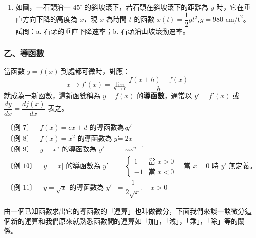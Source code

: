 \begin{enumerate}[label=\arabic*., leftmargin=2em]
  \item 如圖，一石頭沿一 $45^\circ$ 的斜坡滾下，若石頭在斜坡滾下的距離為 $y$ 時，它在垂直方向下降的高度為 $x$，現 $x$ 為時間 $t$ 的函數 $x(t) = \dfrac{1}{2}gt^2, g=980\text{ cm/t}^2$。試問：a. 石頭的垂直下降速率；b. 石頭沿山坡滾動速率。
  \begin{center}
  \end{center}
\end{enumerate}

\subsubsection*{乙、導函數}

當函數 $y=f(x)$ 到處都可微時，對應：
\[ x \longrightarrow f'(x) = \lim_{h\to 0}\dfrac{f(x+h)-f(x)}{h} \]
就成為一新函數，這新函數稱為 $y=f(x)$ 的\textbf{導函數}，通常以 $y'=f'(x)$ 或 $\dfrac{dy}{dx} = \dfrac{df(x)}{dx}$ 表之。

\begin{align*}
\text{〔例 7〕}\quad f(x)=cx+d \text{ 的導函數為 } y' &= c \\
\text{〔例 8〕}\quad f(x)=x^2 \text{ 的導函數為 } y' &= 2x \\
\text{〔例 9〕}\quad y=x^n \text{ 的導函數為 } y' &= nx^{n-1} \\
\text{〔例 10〕}\quad y=|x| \text{ 的導函數為 } y' &= \begin{cases} 1 & \text{當 } x>0 \\ -1 & \text{當 } x<0 \end{cases} \quad \text{當 } x=0 \text{ 時 } y' \text{ 無定義。} \\
\text{〔例 11〕}\quad y=\sqrt{x} \text{ 的導函數為 } y' &= \dfrac{1}{2\sqrt{x}}, \quad x>0
\end{align*}

由一個已知函數求出它的導函數的「運算」也叫做微分，下面我們來談一談微分這個新的運算和我們原來就熟悉函數間的運算如「加」，「減」，「乘」，「除」等的關係。


